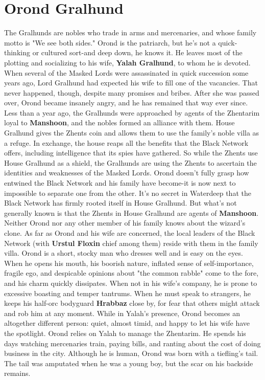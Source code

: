 \documentclass[10pt,a4paper,twoside,twocolumn,openany,nodeprecatedcode]{dndbook}
\begin{document}
\section{Orond Gralhund}
The Gralhunds are nobles who trade in arms and mercenaries, and whose family motto is "We see both sides." Orond is the patriarch, but he's not a quick-thinking or cultured sort-and deep down, he knows it. He leaves most of the plotting and socializing to his wife, \textbf{Yalah Gralhund}, to whom he is devoted.
When several of the Masked Lords were assassinated in quick succession some years ago, Lord Gralhund had expected his wife to fill one of the vacancies. That never happened, though, despite many promises and bribes. After she was passed over, Orond became insanely angry, and he has remained that way ever since.
Less than a year ago, the Gralhunds were approached by agents of the Zhentarim loyal to \textbf{Manshoon}, and the nobles formed an alliance with them. House Gralhund gives the Zhents coin and allows them to use the family's noble villa as a refuge. In exchange, the house reaps all the benefits that the Black Network offers, including intelligence that its spies have gathered. So while the Zhents use House Gralhund as a shield, the Gralhunds are using the Zhents to ascertain the identities and weaknesses of the Masked Lords.
Orond doesn't fully grasp how entwined the Black Network and his family have become-it is now next to impossible to separate one from the other. It's no secret in Waterdeep that the Black Network has firmly rooted itself in House Gralhund. But what's not generally known is that the Zhents in House Gralhund are agents of \textbf{Manshoon}. Neither Orond nor any other member of his family knows about the wizard's clone. As far as Orond and his wife are concerned, the local leaders of the Black Network (with \textbf{Urstul Floxin} chief among them) reside with them in the family villa.
Orond is a short, stocky man who dresses well and is easy on the eyes. When he opens his mouth, his boorish nature, inflated sense of self-importance, fragile ego, and despicable opinions about "the common rabble" come to the fore, and his charm quickly dissipates. When not in his wife's company, he is prone to excessive boasting and temper tantrums. When he must speak to strangers, he keeps his half-orc bodyguard \textbf{Hrabbaz} close by, for fear that others might attack and rob him at any moment. While in Yalah's presence, Orond becomes an altogether different person: quiet, almost timid, and happy to let his wife have the spotlight.
Orond relies on Yalah to manage the Zhentarim. He spends his days watching mercenaries train, paying bills, and ranting about the cost of doing business in the city. Although he is human, Orond was born with a tiefling's tail. The tail was amputated when he was a young boy, but the scar on his backside remains.
\end{document}

